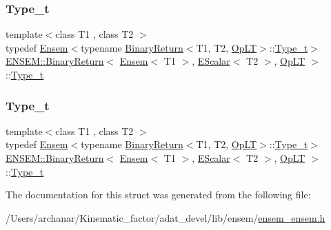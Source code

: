 \subsubsection{\texorpdfstring{Type\_t}{Type\_t}\hspace{0.1cm}{\footnotesize\ttfamily [1/2]}}
{\footnotesize\ttfamily template$<$class T1 , class T2 $>$ \\
typedef \mbox{\hyperlink{classENSEM_1_1Ensem}{Ensem}}$<$typename \mbox{\hyperlink{structENSEM_1_1BinaryReturn}{Binary\+Return}}$<$T1, T2, \mbox{\hyperlink{structENSEM_1_1OpLT}{Op\+LT}}$>$\+::\mbox{\hyperlink{structENSEM_1_1BinaryReturn_3_01Ensem_3_01T1_01_4_00_01EScalar_3_01T2_01_4_00_01OpLT_01_4_ad23674c1df355288c2faa6a3c936b832}{Type\+\_\+t}}$>$ \mbox{\hyperlink{structENSEM_1_1BinaryReturn}{E\+N\+S\+E\+M\+::\+Binary\+Return}}$<$ \mbox{\hyperlink{classENSEM_1_1Ensem}{Ensem}}$<$ T1 $>$, \mbox{\hyperlink{classENSEM_1_1EScalar}{E\+Scalar}}$<$ T2 $>$, \mbox{\hyperlink{structENSEM_1_1OpLT}{Op\+LT}} $>$\+::\mbox{\hyperlink{structENSEM_1_1BinaryReturn_3_01Ensem_3_01T1_01_4_00_01EScalar_3_01T2_01_4_00_01OpLT_01_4_ad23674c1df355288c2faa6a3c936b832}{Type\+\_\+t}}}

\mbox{\label{structENSEM_1_1BinaryReturn_3_01Ensem_3_01T1_01_4_00_01EScalar_3_01T2_01_4_00_01OpLT_01_4_ad23674c1df355288c2faa6a3c936b832}} 
\subsubsection{\texorpdfstring{Type\_t}{Type\_t}\hspace{0.1cm}{\footnotesize\ttfamily [2/2]}}
{\footnotesize\ttfamily template$<$class T1 , class T2 $>$ \\
typedef \mbox{\hyperlink{classENSEM_1_1Ensem}{Ensem}}$<$typename \mbox{\hyperlink{structENSEM_1_1BinaryReturn}{Binary\+Return}}$<$T1, T2, \mbox{\hyperlink{structENSEM_1_1OpLT}{Op\+LT}}$>$\+::\mbox{\hyperlink{structENSEM_1_1BinaryReturn_3_01Ensem_3_01T1_01_4_00_01EScalar_3_01T2_01_4_00_01OpLT_01_4_ad23674c1df355288c2faa6a3c936b832}{Type\+\_\+t}}$>$ \mbox{\hyperlink{structENSEM_1_1BinaryReturn}{E\+N\+S\+E\+M\+::\+Binary\+Return}}$<$ \mbox{\hyperlink{classENSEM_1_1Ensem}{Ensem}}$<$ T1 $>$, \mbox{\hyperlink{classENSEM_1_1EScalar}{E\+Scalar}}$<$ T2 $>$, \mbox{\hyperlink{structENSEM_1_1OpLT}{Op\+LT}} $>$\+::\mbox{\hyperlink{structENSEM_1_1BinaryReturn_3_01Ensem_3_01T1_01_4_00_01EScalar_3_01T2_01_4_00_01OpLT_01_4_ad23674c1df355288c2faa6a3c936b832}{Type\+\_\+t}}}



The documentation for this struct was generated from the following file\+:\begin{DoxyCompactItemize}
\item 
/\+Users/archanar/\+Kinematic\+\_\+factor/adat\+\_\+devel/lib/ensem/\mbox{\hyperlink{lib_2ensem_2ensem__ensem_8h}{ensem\+\_\+ensem.\+h}}\end{DoxyCompactItemize}
